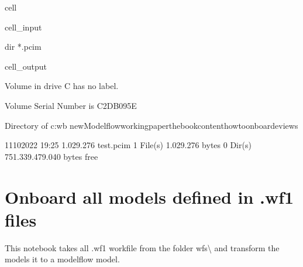 \documentclass[letterpaper,10pt,english]{jupyterBook}
\begin{document}
\begin{sphinxuseclass}{cell}\begin{sphinxVerbatimInput}

\begin{sphinxuseclass}{cell_input}
\begin{sphinxVerbatim}[commandchars=\\\{\}]
dir *.pcim
\end{sphinxVerbatim}

\end{sphinxuseclass}\end{sphinxVerbatimInput}
\begin{sphinxVerbatimOutput}

\begin{sphinxuseclass}{cell_output}
\begin{sphinxVerbatim}[commandchars=\\\{\}]
 Volume in drive C has no label.
\end{sphinxVerbatim}

\begin{sphinxVerbatim}[commandchars=\\\{\}]
 Volume Serial Number is C2DB\PYGZhy{}095E

 Directory of c:\PYGZbs{}wb new\PYGZbs{}Modelflow\PYGZbs{}working\PYGZus{}paper\PYGZbs{}thebook\PYGZbs{}content\PYGZbs{}howto\PYGZbs{}onboard\PYGZbs{}eviews

11\PYGZhy{}10\PYGZhy{}2022  19:25         1.029.276 test.pcim
               1 File(s)      1.029.276 bytes
               0 Dir(s)  751.339.479.040 bytes free
\end{sphinxVerbatim}

\end{sphinxuseclass}\end{sphinxVerbatimOutput}

\end{sphinxuseclass}
\sphinxstepscope


\chapter{Onboard all models  defined in .wf1 files}
\label{\detokenize{content/howto/onboard/eviews/onboard many models from wf1:onboard-all-models-defined-in-wf1-files}}\label{\detokenize{content/howto/onboard/eviews/onboard many models from wf1::doc}}
\sphinxAtStartPar
This notebook takes all .wf1 workfile from the folder wfs\textbackslash{} and transform the models  it to a modelflow model.
\end{document}

